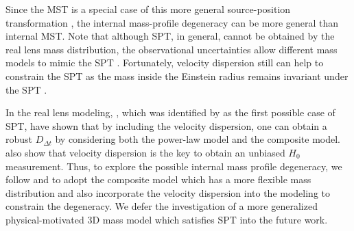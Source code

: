 \documentclass[useAMS,usenatbib]{mnras}
\newcommand{\Ddt}{D_{\Delta t}}
\begin{document}
Since the MST is a special case of this more general source-position transformation \citep[SPT;,][]{SchneiderSluse14}, the internal mass-profile degeneracy can be more general than internal MST. Note that although SPT, in general, cannot be obtained by the real lens mass distribution, the observational uncertainties allow different mass models to mimic the SPT \citep{UnruhEtal17}. Fortunately, velocity dispersion still can help to constrain the SPT as the mass inside the Einstein radius remains invariant under the SPT \citep{UnruhEtal17}. 

In the real lens modeling, \citet{SuyuEtal14}, which was identified by \citet{UnruhEtal17} as the first possible case of SPT, have shown that by including the velocity dispersion, one can obtain a robust $\Ddt$ by considering both the power-law model and the composite model. 
\citet{Sonnenfeld18} also show that velocity dispersion is the key to obtain an unbiased $H_{0}$ measurement. 
Thus, to explore the possible internal mass profile degeneracy, we follow \citet{SuyuEtal14} and \citet{BirrerEtal18} to adopt the composite model which has a more flexible mass distribution and also incorporate the velocity dispersion into the modeling to constrain the degeneracy. We defer the investigation of a more generalized physical-motivated 3D mass model which satisfies SPT into the future work.
\end{document}
